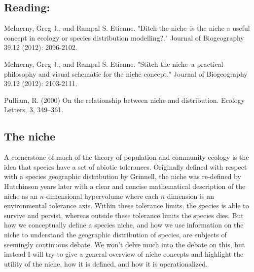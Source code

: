 \documentclass[12pt]{article}
\begin{document}
\subsection*{Reading:}

McInerny, Greg J., and Rampal S. Etienne. "Ditch the niche–is the niche a useful concept in ecology or species distribution modelling?." Journal of Biogeography 39.12 (2012): 2096-2102.

McInerny, Greg J., and Rampal S. Etienne. "Stitch the niche–a practical philosophy and visual schematic for the niche concept." Journal of Biogeography 39.12 (2012): 2103-2111.

Pulliam, R. (2000) On the relationship between niche and distribution. Ecology Letters, 3, 349–361.










\begin{center}
\noindent\hrulefill 
\end{center}



\clearpage


\iffalse  linking populations to the environment, abiotic tolerance, defining and quantifying the niche, niche models \fi



\subsection*{The niche}

A cornerstone of much of the theory of population and community ecology is the idea that species have a set of abiotic tolerances. Originally defined with respect with a species geographic distribution by Grinnell, the niche was re-defined by Hutchinson years later with a clear and concise mathematical description of the niche as an $n$-dimensional hypervolume where each $n$ dimension is an environmental tolerance axis. Within these tolerance limits, the species is able to survive and persist, whereas outside these tolerance limits the species dies. But how we conceptually define a species niche, and how we use information on the niche to understand the geographic distribution of species, are subjects of seemingly continuous debate. We won't delve much into the debate on this, but instead I will try to give a general overview of niche concepts and highlight the utility of the niche, how it is defined, and how it is operationalized. 
\end{document}
